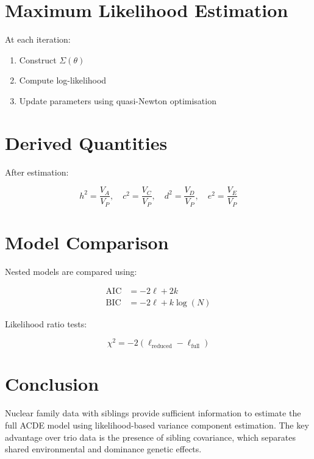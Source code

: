 \documentclass[11pt]{article}
\begin{document}
\section{Maximum Likelihood Estimation}

At each iteration:

\begin{enumerate}
\item Construct $\Sigma(\theta)$
\item Compute log-likelihood
\item Update parameters using quasi-Newton optimisation
\end{enumerate}

\section{Derived Quantities}

After estimation:

\[
h^2 = \frac{V_A}{V_P},\quad
c^2 = \frac{V_C}{V_P},\quad
d^2 = \frac{V_D}{V_P},\quad
e^2 = \frac{V_E}{V_P}
\]

\section{Model Comparison}

Nested models are compared using:

\begin{align}
\text{AIC} &= -2\ell + 2k \\
\text{BIC} &= -2\ell + k\log(N)
\end{align}

Likelihood ratio tests:

\[
\chi^2 = -2(\ell_{\text{reduced}} - \ell_{\text{full}})
\]

\section{Conclusion}

Nuclear family data with siblings provide sufficient information to
estimate the full ACDE model using likelihood-based variance component
estimation. The key advantage over trio data is the presence of sibling
covariance, which separates shared environmental and dominance genetic
effects.
\end{document}
